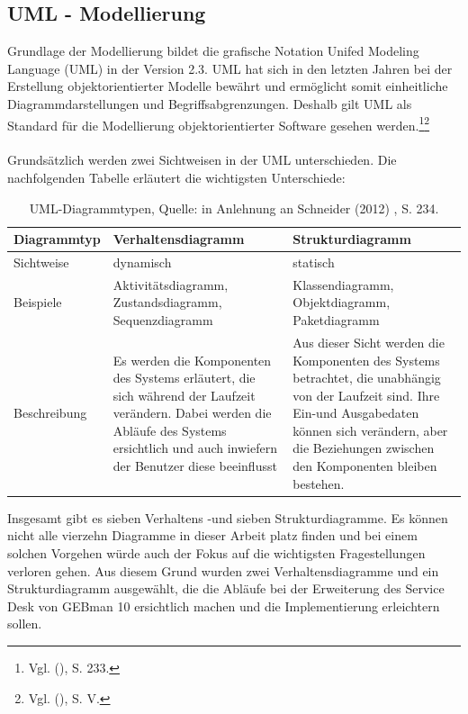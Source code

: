\newpage


\subsection{UML - Modellierung}
\noindent
Grundlage der Modellierung bildet die grafische Notation Unifed Modeling Language (UML) in der Version 2.3. UML hat sich in den letzten Jahren bei der Erstellung objektorientierter Modelle bewährt und ermöglicht somit einheitliche Diagrammdarstellungen und Begriffsabgrenzungen. Deshalb gilt UML als Standard für die Modellierung objektorientierter Software gesehen werden.\footnote{Vgl. \citeauthor{Schneider} (\citeyear{Schneider}), S. 233.}\footnote{Vgl. \citeauthor{Balzert} (\citeyear{Balzert}), S. V.}\\\\
Grundsätzlich werden zwei Sichtweisen in der UML unterschieden. Die nachfolgenden Tabelle erläutert die wichtigsten Unterschiede:

\begin{table}[h!]
    \begin{tabular}{ | p{2.5cm}| p{6cm} | p{6cm} |}
    \hline
    Diagrammtyp & Verhaltensdiagramm & Strukturdiagramm \\ \hline
   Sichtweise & dynamisch & statisch \\ \hline
   Beispiele & Aktivitätsdiagramm, Zustandsdiagramm, Sequenzdiagramm &  Klassendiagramm, 
   Objektdiagramm, Paketdiagramm\\ \hline
   Beschreibung &  Es werden die Komponenten des Systems erläutert, die sich während der Laufzeit 
   verändern. Dabei werden die Abläufe des Systems ersichtlich und auch inwiefern der Benutzer diese 
   beeinflusst & Aus dieser Sicht werden die Komponenten des Systems betrachtet, die unabhängig von 
   der Laufzeit sind. Ihre Ein-und Ausgabedaten können sich verändern, aber die Beziehungen zwischen 
   den Komponenten bleiben bestehen. \\ \hline  
    \end{tabular}
    \caption{UML-Diagrammtypen, Quelle: in Anlehnung an Schneider (2012) , S. 234.}
\end{table}


\noindent
Insgesamt gibt es sieben Verhaltens -und sieben Strukturdiagramme. Es können nicht alle vierzehn Diagramme in dieser Arbeit platz finden und bei einem solchen Vorgehen würde auch der Fokus auf die wichtigsten Fragestellungen verloren gehen. Aus diesem Grund wurden zwei Verhaltensdiagramme und ein Strukturdiagramm ausgewählt, die die Abläufe bei der Erweiterung des Service Desk von GEBman 10 ersichtlich machen und die Implementierung erleichtern sollen. \\

